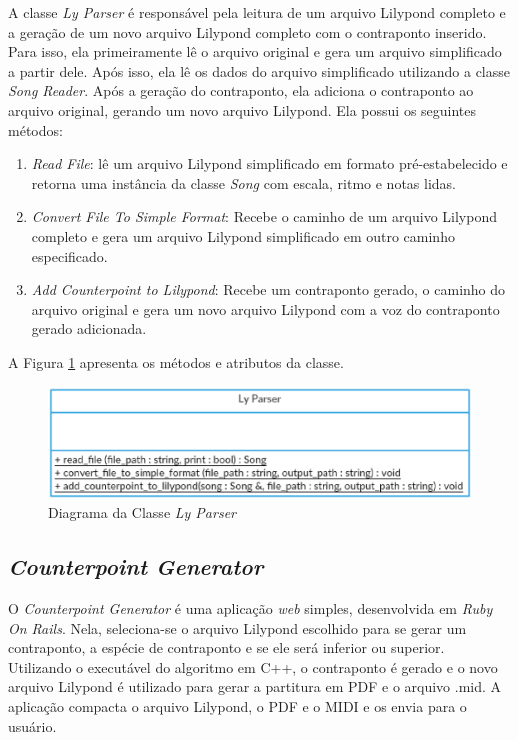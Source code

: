       A classe \textit{Ly Parser} é responsável pela leitura de um arquivo Lilypond completo e a geração de um novo arquivo Lilypond completo com o contraponto inserido. Para isso, ela primeiramente lê o arquivo original e gera um arquivo simplificado a partir dele. Após isso, ela lê os dados do arquivo simplificado utilizando a classe \textit{Song Reader}. Após a geração do contraponto, ela adiciona o contraponto ao arquivo original, gerando um novo arquivo Lilypond. Ela possui os seguintes métodos:

      \begin{enumerate}
        \item \textit{Read File}: lê um arquivo Lilypond simplificado em formato pré-estabelecido e retorna uma instância da classe \textit{Song} com escala, ritmo e notas lidas.
        \item \textit{Convert File To Simple Format}: Recebe o caminho de um arquivo Lilypond completo e gera um arquivo Lilypond simplificado em outro caminho especificado.
        \item \textit{Add Counterpoint to Lilypond}: Recebe um contraponto gerado, o caminho do arquivo original e gera um novo arquivo Lilypond com a voz do contraponto gerado adicionada.
      \end{enumerate}

      A Figura \ref{lyparserclass} apresenta os métodos e atributos da classe.

      \begin{figure}[htb]
        \centering
        \includegraphics[scale=0.7]{figuras/lyparserclass.eps}
        \caption{Diagrama da Classe \textit{Ly Parser}}
        \label{lyparserclass}
      \end{figure}

    \subsection[\textit{Counterpoint Generator}]{\textit{Counterpoint Generator}}

      O \textit{Counterpoint Generator} é uma aplicação \textit{web} simples, desenvolvida em \textit{Ruby On Rails}. Nela, seleciona-se o arquivo Lilypond escolhido para se gerar um contraponto, a espécie de contraponto e se ele será inferior ou superior. Utilizando o executável do algoritmo em C++, o contraponto é gerado e o novo arquivo Lilypond é utilizado para gerar a partitura em PDF e o arquivo .mid. A aplicação compacta o arquivo Lilypond, o PDF e o MIDI e os envia para o usuário.


